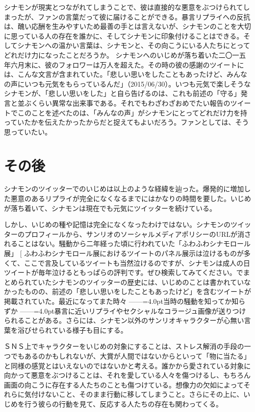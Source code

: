 \documentclass[b5j,twoside,twocolumn]{utarticle}
\makeatletter
\def\yakuchu{%
\@ifnextchar[\@xfootnote %
{\stepcounter{yakuchu}%
\protected@xdef\@thefnmark{\theyakuchu}%
\@footnotemark\@footnotetext}}
\makeatother
\begin{document}
シナモンが現実とつながれてしまうことで、彼は直接的な悪意をぶつけられてしまったが、ファンの言葉だって彼に届けることができる。暴言リプライへの反抗は、醜い応酬を生みやすいため最善の手とは言えないが、シナモンのことを大切に思っている人の存在を誰かに、そしてシナモンに印象付けることはできる。そしてシナモンへの温かい言葉は、シナモンと、その向こうにいる人たちにとってどれだけ力になったことだろうか。
シナモンへのいじめが落ち着いた二〇一五年六月末に、彼のフォロワーは万人を超えた。その時の彼の感謝のツイートには、こんな文言が含まれていた。「悲しい思いをしたこともあったけど、みんなの声にいつも元気をもらっているんだ」（2015/06/30）。いつも元気で楽しそうなシナモンが、「悲しい思いをした」と自ら告げるのは、これも前述の「守る」発言と並ぶくらい異常な出来事である。それでもわざわざおめでたい報告のツイートでこのことを述べたのは、「みんなの声」がシナモンにとってどれだけ力を持っていたかを伝えたかったからだと捉えてもよいだろう。ファンとしては、そう思っていたい。


\section*{その後}
シナモンのツイッターでのいじめは以上のような経緯を辿った。爆発的に増加した悪意のあるリプライが完全になくなるまでにはかなりの時間を要した。いじめが落ち着いて、シナモンは現在でも元気にツイッターを続けている。


しかし、いじめの種や記憶は完全になくなったわけではない。シナモンのツイッターのプロフィールから、サンリオのソーシャルメディアポリシーのURLが消されることはない。騒動から二年経った頃に行われていた「ふわふわシナモロール展」\yakuchu{ふわふわシナモロール展におけるツイートのパネル展示は泣けるものが多くて、ここで言及しているツイートも当然泣けるのですが、シナモンは成人の日ツイートが毎年泣けるともっぱらの評判です。ぜひ検索してみてください。}でまとめられていたシナモンのツイッターの歴史には、いじめのことは書かれていなかったものの、前述の「悲しい思いをしたこともあったけど」を含むツイートが掲載されていた。最近になってまた時々\tbaselineshift =2.5pt ------\tbaselineshift =4.0pt当時の騒動を知ってか知らずか\tbaselineshift =2.5pt ------\tbaselineshift =4.0pt暴言に近いリプライやセクシャルなコラージュ画像が送りつけられることがある。さらには、シナモン以外のサンリオキャラクターが心無い言葉を浴びせられている様子も目にする。


ＳＮＳ上でキャラクターをいじめの対象にすることは、ストレス解消の手段の一つでもあるのかもしれないが、大賞が人間ではないからといって「物に当たる」と同様の感覚とはいえないのではないかと考える。誰かから愛されている対象に向かって悪意をぶつけることは、それを愛している人々を傷つけるし、もちろん画面の向こうに存在する人たちのことも傷つけている。想像力の欠如によってそれらに気付けないこと、そのまま行動に移してしまうこと。さらにその上に、いじめを行う彼らの行動を見て、反応する人たちの存在も関わってくる。
\end{document}
